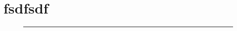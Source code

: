 \chapter{fsdfsdf}

\begin{figure}[h]\centering
\rule{6cm}{4cm}
\end{figure}

\blindtext 

\blindtext